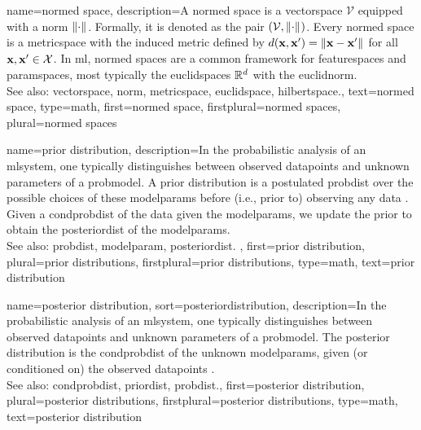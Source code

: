 {name={normed space},
	description={A normed space is a \gls{vectorspace} $\mathcal{V}$ equipped with a \gls{norm} 
		$\normgeneric{\cdot}{}$. Formally, it is denoted as the pair $(\mathcal{V}, \normgeneric{\cdot}{})$. 
		Every normed space is a \gls{metricspace} with the induced \gls{metric} defined by 
		$\metric{\featurevec}{\featurevec'} = \normgeneric{\featurevec - \featurevec'}{}$ 
		for all ${\bf x}, {\bf x}' \in \mathcal{X}$. 
		In \gls{ml}, normed spaces are a common framework for \glspl{featurespace} and \glspl{paramspace}, 
		most typically the \glspl{euclidspace} $\mathbb{R}^d$ with the \gls{euclidnorm}.  
		\\
		See also: \gls{vectorspace}, \gls{norm}, \gls{metricspace}, \gls{euclidspace}, \gls{hilbertspace}.},
	text={normed space},
	type=math,
	first={normed space},
	firstplural={normed spaces},
	plural={normed spaces}
}

{name={prior distribution},
	description={In the probabilistic analysis of an \gls{mlsystem}, one typically distinguishes 
		between observed \glspl{datapoint} and unknown \glspl{parameter} of a \gls{probmodel}. 
		A prior distribution is a postulated \gls{probdist} over the possible choices of 
		these \glspl{modelparam} before (i.e., prior to) observing any \gls{data} \cite{BishopBook}. 
		Given a \gls{condprobdist} of the \gls{data} given the \glspl{modelparam}, 
		we update the prior to obtain the \gls{posteriordist} of the \glspl{modelparam}.
		\\
		See also: \gls{probdist}, \gls{modelparam}, \gls{posteriordist}. },
	first={prior distribution},
	plural={prior distributions},
	firstplural={prior distributions},
	type=math,
	text={prior distribution}
}

{name={posterior distribution},
sort={posteriordistribution},
	description={In the probabilistic analysis of an \gls{mlsystem}, 
		one typically distinguishes between observed \glspl{datapoint} and unknown 
		\glspl{parameter} of a \gls{probmodel}. The \gls{posterior} distribution 
		is the \gls{condprobdist} of the unknown \glspl{modelparam}, 
		given (or conditioned on) the observed \glspl{datapoint} \cite{BishopBook}.
		\\ 
		See also: \gls{condprobdist}, \gls{priordist}, \gls{probdist}.},
	first={posterior distribution},
	plural={posterior distributions},
	firstplural={posterior distributions},
	type=math,
	text={posterior distribution}
}

